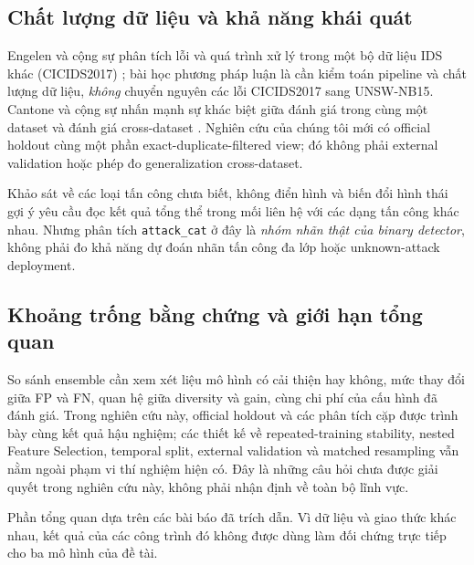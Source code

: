 \subsection{Chất lượng dữ liệu và khả năng khái quát}
Engelen và cộng sự phân tích lỗi và quá trình xử lý trong một bộ dữ liệu IDS khác (CICIDS2017) \cite{legacyL02}; bài học phương pháp luận là cần kiểm toán pipeline và chất lượng dữ liệu, \emph{không} chuyển nguyên các lỗi CICIDS2017 sang UNSW-NB15. Cantone và cộng sự nhấn mạnh sự khác biệt giữa đánh giá trong cùng một dataset và đánh giá cross-dataset \cite{legacyL09}. Nghiên cứu của chúng tôi mới có official holdout cùng một phần exact-duplicate-filtered view; đó không phải external validation hoặc phép đo generalization cross-dataset.

Khảo sát về các loại tấn công chưa biết, không điển hình và biến đổi hình thái \cite{legacyL10} gợi ý yêu cầu đọc kết quả tổng thể trong mối liên hệ với các dạng tấn công khác nhau. Nhưng phân tích \texttt{attack\_cat} ở đây là \emph{nhóm nhãn thật của binary detector}, không phải đo khả năng dự đoán nhãn tấn công đa lớp hoặc unknown-attack deployment.

\subsection{Khoảng trống bằng chứng và giới hạn tổng quan}
So sánh ensemble cần xem xét liệu mô hình có cải thiện hay không, mức thay đổi giữa FP và FN, quan hệ giữa diversity và gain, cùng chi phí của cấu hình đã đánh giá. Trong nghiên cứu này, official holdout và các phân tích cặp được trình bày cùng kết quả hậu nghiệm; các thiết kế về repeated-training stability, nested Feature Selection, temporal split, external validation và matched resampling vẫn nằm ngoài phạm vi thí nghiệm hiện có. Đây là những câu hỏi chưa được giải quyết trong nghiên cứu này, không phải nhận định về toàn bộ lĩnh vực.

Phần tổng quan dựa trên các bài báo đã trích dẫn. Vì dữ liệu và giao thức khác nhau, kết quả của các công trình đó không được dùng làm đối chứng trực tiếp cho ba mô hình của đề tài.
